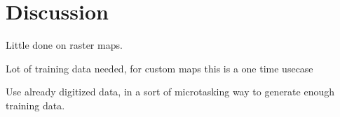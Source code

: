 \chapter{Discussion}

Little done on raster maps.

Lot of training data needed, for custom maps this is a one time usecase

Use already digitized data, in a sort of microtasking way to generate enough training data.